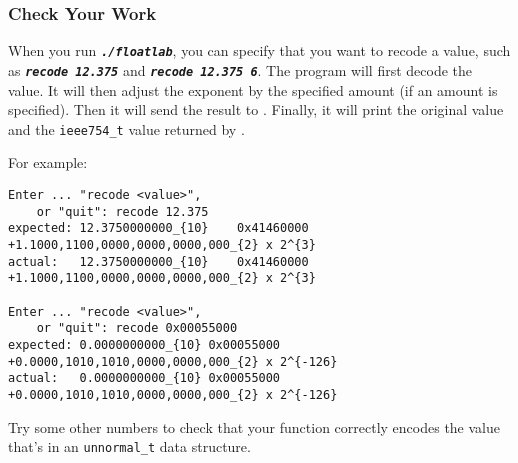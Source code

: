 
\subsubsection*{Check Your Work}

When you run \texttt{\textbf{\textit{./floatlab}}}, you can specify that you want to recode a value, such as \texttt{\textbf{\textit{recode 12.375}}} and \texttt{\textbf{\textit{recode 12.375 6}}}.
The program will first decode the value.
It will then adjust the exponent by the specified amount (if an amount is specified).
Then it will send the result to .
Finally, it will print the original value and the \lstinline{ieee754_t} value returned by .

For example:

\begin{verbatim}
Enter ... "recode <value>",
    or "quit": recode 12.375
expected: 12.3750000000_{10}	0x41460000	+1.1000,1100,0000,0000,0000,000_{2} x 2^{3}
actual:   12.3750000000_{10}	0x41460000	+1.1000,1100,0000,0000,0000,000_{2} x 2^{3}

Enter ... "recode <value>",
    or "quit": recode 0x00055000
expected: 0.0000000000_{10}	0x00055000	+0.0000,1010,1010,0000,0000,000_{2} x 2^{-126}
actual:   0.0000000000_{10}	0x00055000	+0.0000,1010,1010,0000,0000,000_{2} x 2^{-126}
\end{verbatim}

Try some other numbers to check that your  function correctly encodes the value that's in an \lstinline{unnormal_t} data structure.
